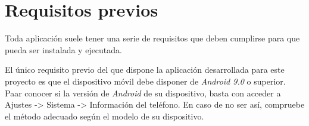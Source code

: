 
\section{Requisitos previos}
Toda aplicación suele tener una serie de requisitos que deben cumplirse para que pueda 
ser instalada y ejecutada.\medskip

El único requisito previo del que dispone la aplicación desarrollada para este proyecto es que 
el dispositivo móvil debe disponer de \textit{Android 9.0} o superior. Paar conocer si la versión 
de \textit{Android} de su dispositivo, basta con acceder a Ajustes -> Sistema -> Información del teléfono.
En caso de no ser así, compruebe el método adecuado según el modelo de su dispositivo.
